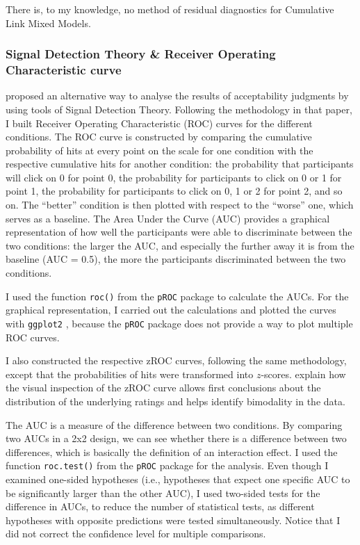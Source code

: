 There is, to my knowledge, no method of residual diagnostics for Cumulative Link Mixed Models.

\subsubsection{Signal Detection Theory \& Receiver Operating Characteristic curve} \label{ch:ROC}
\citet{Dillon.2019} proposed an alternative way to analyse the results of acceptability judgments by using tools of Signal Detection Theory. Following the methodology in that paper, I built Receiver Operating Characteristic (ROC) curves for the different conditions. The ROC curve is constructed by comparing the cumulative probability of hits at every point on the scale for one condition with the respective cumulative hits for another condition: the probability that participants will click on 0 for point 0, the probability for participants to click on 0 or 1 for point 1, the probability for participants to click on 0, 1 or 2 for point 2, and so on. The ``better'' condition is then plotted with respect to the ``worse'' one, which serves as a baseline. The Area Under the Curve (AUC) provides a graphical representation of how well the participants were able to discriminate between the two conditions: the larger the AUC, and especially the further away it is from the baseline (AUC = 0.5), the more the participants discriminated between the two conditions. 

I used the function \texttt{roc()} from the \texttt{pROC} package \citep{pROC} to calculate the AUCs. For the graphical representation, I carried out the calculations and plotted the curves with \texttt{ggplot2} \citep{Wickham.2016}, because the \texttt{pROC} package does not provide a way to plot multiple ROC curves.

I also constructed the respective zROC curves, following the same methodology, except that the probabilities of hits were transformed into $z$-scores. \citet{Dillon.2019} explain how the visual inspection of the zROC curve allows first conclusions about the distribution of the underlying ratings and helps identify bimodality in the data.  

The AUC is a measure of the difference between two conditions. By comparing two AUCs in a 2x2 design, we can see whether there is a difference between two differences, which is basically the definition of an interaction effect. I used the function \texttt{roc.test()} from the \texttt{pROC} package \citep{pROC} for the analysis. Even though I examined one-sided hypotheses (i.e., hypotheses that expect one specific AUC to be significantly larger than the other AUC), I used two-sided tests for the difference in AUCs, to reduce the number of statistical tests, as different hypotheses with opposite predictions were tested simultaneously. Notice that I did not correct the confidence level for multiple comparisons. 

